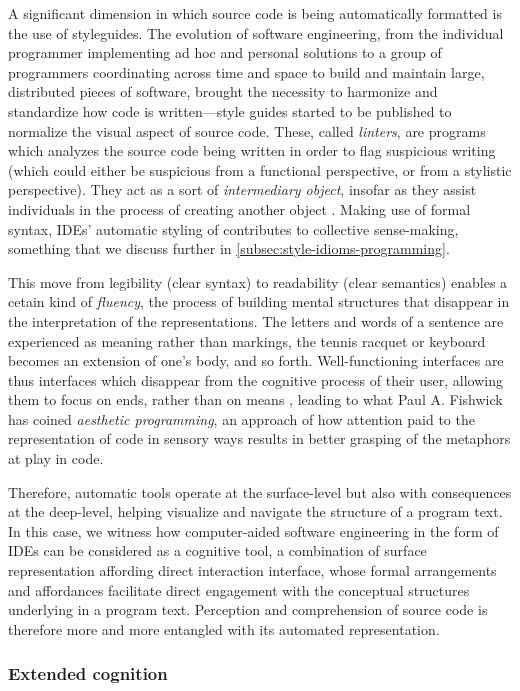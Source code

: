 A significant dimension in which source code is being automatically formatted is the use of styleguides. The evolution of software engineering, from the individual programmer implementing ad hoc and personal solutions to a group of programmers coordinating across time and space to build and maintain large, distributed pieces of software, brought the necessity to harmonize and standardize how code is written—style guides started to be published to normalize the visual aspect of source code. These, called \emph{linters}, are programs which analyzes the source code being written in order to flag suspicious writing (which could either be suspicious from a functional perspective, or from a stylistic perspective). They act as a sort of \emph{intermediary object}, insofar as they assist individuals in the process of creating another object \citep{jeantet_objets_1998}. Making use of formal syntax, IDEs' automatic styling of contributes to collective sense-making, something that we discuss further in \ref{subsec:style-idioms-programming}.

This move from legibility (clear syntax) to readability (clear semantics) enables a cetain kind of \emph{fluency}, the process of building mental structures that disappear in the interpretation of the representations. The letters and words of a sentence are experienced as meaning rather than markings, the tennis racquet or keyboard becomes an extension of one's body, and so forth. Well-functioning interfaces are thus interfaces which disappear from the cognitive process of their user, allowing them to focus on ends, rather than on means \citep{galloway_interface_2012}, leading to what Paul A. Fishwick has coined \emph{aesthetic programming}, an approach of how attention paid to the representation of code in sensory ways results in better grasping of the metaphors at play in code.

Therefore, automatic tools operate at the surface-level but also with consequences at the deep-level, helping visualize and navigate the structure of a program text. In this case, we witness how computer-aided software engineering in the form of IDEs can be considered as a cognitive tool, a combination of surface representation affording direct interaction  interface, whose formal arrangements and affordances facilitate direct engagement with the conceptual structures underlying in a program text. Perception and comprehension of source code is therefore more and more entangled with its automated representation.

\subsubsection{Extended cognition}
\label{subsubsec:extended-cognition}


